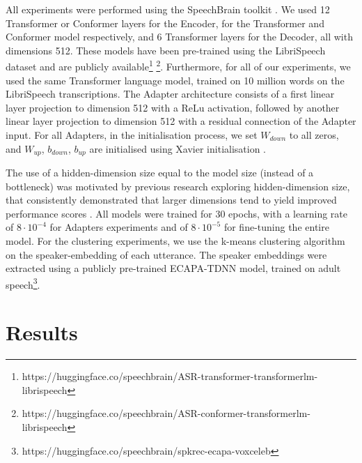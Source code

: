 All experiments were performed using the SpeechBrain toolkit \cite{speechbrain}. We used  12 Transformer or Conformer layers for the Encoder, for the Transformer and Conformer model respectively, and 6 Transformer layers for the Decoder, all with dimensions 512. These models have been pre-trained using the LibriSpeech dataset \cite{librispeech} and are publicly available\footnote{https://huggingface.co/speechbrain/ASR-transformer-transformerlm-librispeech} \footnote{https://huggingface.co/speechbrain/ASR-conformer-transformerlm-librispeech}. Furthermore, for all of our experiments, we used the same Transformer language model, trained on 10 million words 
on the LibriSpeech transcriptions.
The Adapter architecture consists of a  first linear layer projection to dimension 512 with a ReLu activation, followed by another linear layer projection to dimension 512 with a residual connection of the Adapter input. For all Adapters, in the initialisation process, we set $W_{down}$ to all zeros, and $W_{up}$, $b_{down}$, $b_{up}$ are initialised using Xavier initialisation \cite{glorot2010understanding}.


The use of a hidden-dimension size equal to the model size (instead of a bottleneck) was motivated by previous research exploring hidden-dimension size, that consistently demonstrated that larger dimensions tend to yield improved performance scores \cite{chen2023efficient}.
All models were trained for 30 epochs, with a learning rate of $8\cdot10^{-4}$ for Adapters experiments and of $8\cdot10^{-5}$ for fine-tuning the entire model.
For the clustering experiments, we use the k-means clustering algorithm on the speaker-embedding of each utterance. The speaker embeddings were extracted using a publicly pre-trained ECAPA-TDNN model, trained on adult speech\footnote{https://huggingface.co/speechbrain/spkrec-ecapa-voxceleb}.

\section{Results}
\label{sec:results}


